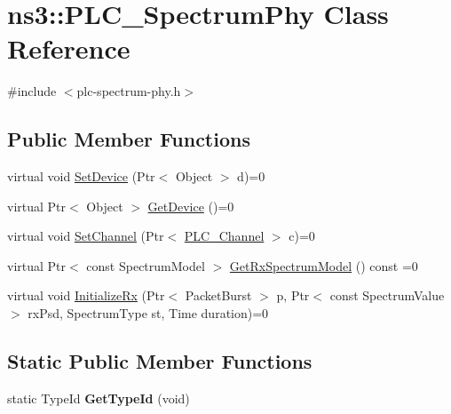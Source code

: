 \hypertarget{classns3_1_1PLC__SpectrumPhy}{\section{ns3\-:\-:\-P\-L\-C\-\_\-\-Spectrum\-Phy \-Class \-Reference}
\label{classns3_1_1PLC__SpectrumPhy}
}


{\ttfamily \#include $<$plc-\/spectrum-\/phy.\-h$>$}

\subsection*{\-Public \-Member \-Functions}
\begin{DoxyCompactItemize}
\item 
virtual void \hyperlink{classns3_1_1PLC__SpectrumPhy_a2675707ef0723179272b3061ede2d6c3}{\-Set\-Device} (\-Ptr$<$ \-Object $>$ d)=0
\item 
virtual \-Ptr$<$ \-Object $>$ \hyperlink{classns3_1_1PLC__SpectrumPhy_ac70e432f5b57931a83a5c19c737aea7c}{\-Get\-Device} ()=0
\item 
virtual void \hyperlink{classns3_1_1PLC__SpectrumPhy_aa4376915a9c4b950111412d77bf105a7}{\-Set\-Channel} (\-Ptr$<$ \hyperlink{classns3_1_1PLC__Channel}{\-P\-L\-C\-\_\-\-Channel} $>$ c)=0
\item 
virtual \-Ptr$<$ const \-Spectrum\-Model $>$ \hyperlink{classns3_1_1PLC__SpectrumPhy_a28b28091075d30da4a37cdb6d2ff45ab}{\-Get\-Rx\-Spectrum\-Model} () const =0
\item 
virtual void \hyperlink{classns3_1_1PLC__SpectrumPhy_abb4e75a04569d7bcac70ad0530455658}{\-Initialize\-Rx} (\-Ptr$<$ \-Packet\-Burst $>$ p, \-Ptr$<$ const \-Spectrum\-Value $>$ rx\-Psd, \-Spectrum\-Type st, \-Time duration)=0
\end{DoxyCompactItemize}
\subsection*{\-Static \-Public \-Member \-Functions}
\begin{DoxyCompactItemize}
\item 
\hypertarget{classns3_1_1PLC__SpectrumPhy_a05068b1283b55b51cf612c0369e7dda0}{static \-Type\-Id {\bfseries \-Get\-Type\-Id} (void)}\label{classns3_1_1PLC__SpectrumPhy_a05068b1283b55b51cf612c0369e7dda0}

\end{DoxyCompactItemize}


